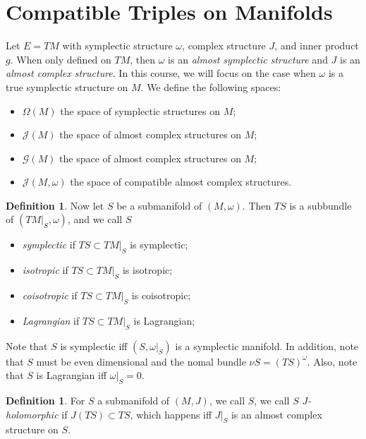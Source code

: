 \documentclass[leqno, openany]{memoir}
\theoremstyle{definition}
\newtheorem{defn}[thm]{Definition}
\theoremstyle{remark}
\theoremstyle{plain}
\theoremstyle{definition}
\theoremstyle{remark}
\newcommand{\mc}[1]{\mathcal{#1}}
\begin{document}
\section{Compatible Triples on Manifolds}%
\label{sec:compatible_triples_on_manifolds}

Let $E = TM$ with symplectic structure $\omega$, complex structure $J$, and inner product $g$. When only defined on $TM$, then $\omega$ is an \textit{almost symplectic structure} and $J$ is an \textit{almost complex structure}. In this course, we will focus on the case when $\omega$ is a true symplectic structure on $M$. We define the following spaces:
\begin{itemize}
    \item $\Omega(M)$ the space of symplectic structures on $M$;
    \item $\mc{J}(M)$ the space of almost complex structures on $M$;
    \item $\mc{G}(M)$ the space of almost complex structures on $M$;
    \item $\mc{J}(M, \omega)$ the space of compatible almost complex structures.
\end{itemize}

\begin{defn}
    Now let $S$ be a submanifold of $(M, \omega)$. Then $TS$ is a subbundle of $(TM|_S, \omega)$, and we call $S$
    \begin{itemize}
        \item \textit{symplectic} if $TS \subset TM|_S$ is symplectic;
        \item \textit{isotropic} if $TS \subset TM|_S$ is isotropic;
        \item \textit{coisotropic} if $TS \subset TM|_S$ is coisotropic;
        \item \textit{Lagrangian} if $TS \subset TM|_S$ is Lagrangian;
    \end{itemize}
\end{defn}

Note that $S$ is symplectic iff $(S, \omega|_S)$ is a symplectic manifold. In addition, note that $S$ must be even dimensional and the nomal bundle $\nu S = (TS)^{\omega}$. Also, note that $S$ is Lagrangian iff $\omega|_S = 0$.

\begin{defn}
    For $S$ a submanifold of $(M, J)$, we call $S$, we call $S$ \textit{$J$-holomorphic} if $J(TS) \subset TS$, which happens iff $J|_S$ is an almost complex structure on $S$.
\end{defn}
\end{document}
